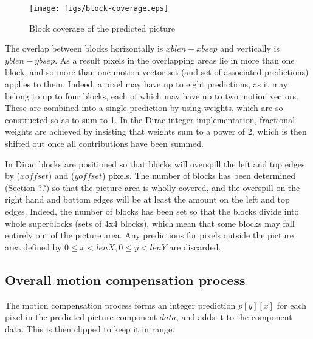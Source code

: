 \begin{figure}[h]
\centering
\texttt{[image: figs/block-coverage.eps]}
\caption{Block coverage of the predicted picture}
\label{fig:blockcoverage}
\end{figure}

\begin{informative*}
The overlap between blocks horizontally is $xblen - xbsep$ and vertically is
$yblen - ybsep$. As a result pixels in the overlapping areas lie in more than
one block, and so more than one motion vector set (and set of associated predictions)
applies to them. Indeed, a pixel may have up to eight predictions, as it may belong to
up to four blocks, each of which may have up to two motion vectors. These are combined
into a single prediction by using weights, which are so constructed so as to sum to 1. In the
 Dirac integer implementation, fractional weights are achieved by insisting that weights sum 
to a power of 2, which is then shifted out once all contributions have been summed.

In Dirac blocks are positioned so that blocks will overspill the left and top edges by 
($xoffset$) and ($yoffset$) pixels.  The number of blocks has been
determined (Section ??) so that the picture area is wholly covered, and the overspill
 on the right hand and bottom edges will be at least the amount on the left and top edges. 
Indeed, the number of blocks has been set so that the blocks divide into whole superblocks
(sets of 4x4 blocks), which mean that some blocks may fall entirely out of the picture area. 
 Any predictions for pixels outside the picture area defined by $0 \leq x < lenX, 0 \leq y <lenY$
are discarded.

\end{informative*}

\subsection{Overall motion compensation process}
\label{mcprocess}

The motion compensation process forms an integer prediction $p[y][x]$ for each pixel in the predicted
picture component $data$, and adds it to the component data. This is then clipped to keep it in range.

\begin{pseudo*}
    \bsEND
\bsEND
\end{pseudo*}

